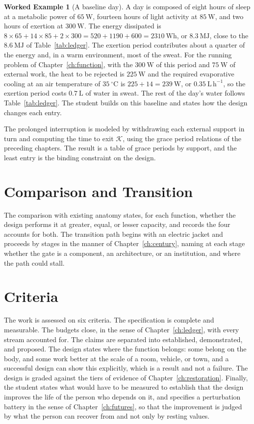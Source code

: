 \documentclass[11pt,openany]{book}
\theoremstyle{definition}
\newtheorem{example}{Worked Example}[chapter]
\theoremstyle{remark}
\newcommand{\Kset}{\mathcal{K}}
\begin{document}
\begin{example}[A baseline day]
\label{ex:baseline}
A day is composed of eight hours of sleep at a metabolic power of $65\ \mathrm{W}$, fourteen hours of light activity at $85\ \mathrm{W}$, and two hours of exertion at $300\ \mathrm{W}$. The energy dissipated is $8\times65+14\times85+2\times300=520+1190+600=2310\ \mathrm{Wh}$, or $8.3\ \mathrm{MJ}$, close to the $8.6\ \mathrm{MJ}$ of Table~\ref{tab:ledger}. The exertion period contributes about a quarter of the energy and, in a warm environment, most of the sweat. For the running problem of Chapter~\ref{ch:function}, with the $300\ \mathrm{W}$ of this period and $75\ \mathrm{W}$ of external work, the heat to be rejected is $225\ \mathrm{W}$ and the required evaporative cooling at an air temperature of $35\ ^\circ\mathrm{C}$ is $225+14=239\ \mathrm{W}$, or $0.35\ \mathrm{L\,h^{-1}}$, so the exertion period costs $0.7\ \mathrm{L}$ of water in sweat. The rest of the day's water follows Table~\ref{tab:ledger}. The student builds on this baseline and states how the design changes each entry.
\end{example}

The prolonged interruption is modeled by withdrawing each external support in turn and computing the time to exit $\Kset$, using the grace period relations of the preceding chapters. The result is a table of grace periods by support, and the least entry is the binding constraint on the design.

\section{Comparison and Transition}

The comparison with existing anatomy states, for each function, whether the design performs it at greater, equal, or lesser capacity, and records the four accounts for both. The transition path begins with an electric jacket and proceeds by stages in the manner of Chapter~\ref{ch:century}, naming at each stage whether the gate is a component, an architecture, or an institution, and where the path could stall.

\section{Criteria}

The work is assessed on six criteria. The specification is complete and measurable. The budgets close, in the sense of Chapter~\ref{ch:ledger}, with every stream accounted for. The claims are separated into established, demonstrated, and proposed. The design states where the function belongs: some belong on the body, and some work better at the scale of a room, vehicle, or town, and a successful design can show this explicitly, which is a result and not a failure. The design is graded against the tiers of evidence of Chapter~\ref{ch:restoration}. Finally, the student states what would have to be measured to establish that the design improves the life of the person who depends on it, and specifies a perturbation battery in the sense of Chapter~\ref{ch:futures}, so that the improvement is judged by what the person can recover from and not only by resting values.
\end{document}
